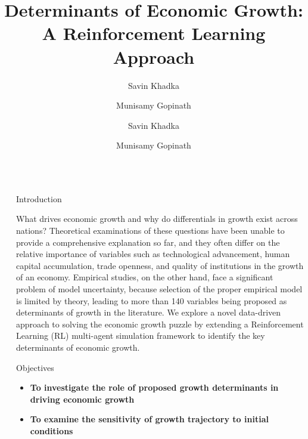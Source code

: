 \documentclass[final]{beamer}
\title{Determinants of Economic Growth: A Reinforcement Learning Approach}
\author{Savin Khadka \and Munisamy Gopinath}
\institute{}
\author{Savin Khadka \inst{1} \and Munisamy Gopinath \inst{1}}
\institute[shortinst]{\inst{1} Dept of Ag. and Applied Economics, University of Georgia}
\newlength{\sepwid}
\newlength{\onecolwid}
\newcommand{\separatorcolumn}{\begin{column}{\sepwid}\end{column}}
\begin{document}
\begin{frame}[t]
\begin{columns}[t]
\separatorcolumn

\begin{column}{\onecolwid}

\begin{block}{Introduction}

What drives economic growth and why do differentials in growth exist across nations?  Theoretical examinations of these questions have been unable to provide a comprehensive explanation so far, and they often differ on the relative importance of variables such as technological advancement, human capital accumulation, trade openness, and quality of institutions in the growth of an economy. Empirical studies, on the other hand, face a significant problem of model uncertainty, because selection of the proper empirical model is limited by theory, leading to more than 140 variables being proposed as determinants of growth in the literature.\cite{moral2012determinants} We explore a novel data-driven approach to solving the economic growth puzzle by extending a Reinforcement Learning (RL) multi-agent simulation framework\cite{zheng2020ai} to identify the key determinants of economic growth.
\end{block}


\begin{alertblock}{Objectives}
\begin{itemize}
    \item \textbf{To investigate the role of proposed growth determinants in driving economic growth}
    
    \item \textbf{To examine the sensitivity of growth trajectory to initial conditions}
\end{itemize}
\end{alertblock}


\end{column}
\end{columns}
\end{frame}
\end{document}
